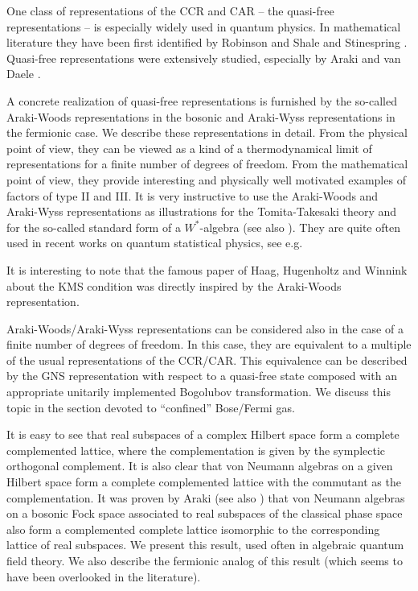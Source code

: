 \documentclass{svmult}
\begin{document}
 One class of representations of the CCR and CAR -- the quasi-free
representations -- is especially widely used in quantum physics.
In mathematical literature they have been first identified  by 
Robinson \cite{Rob} and Shale and Stinespring \cite{ShSt}.
Quasi-free representations were extensively studied,
especially by Araki \cite{Ar6,Ar2,Ar3,ArShi,AY} and van Daele \cite{vD}.

 A concrete
realization of quasi-free representations is furnished by the so-called
Araki-Woods representations  \cite{AW} in the bosonic 
and  Araki-Wyss representations  \cite{AWy} in
the fermionic case. We describe these representations in detail. 
 From the physical point of view, they can be viewed as
a kind of a thermodynamical limit of representations for a finite number of
degrees of freedom.  From the mathematical point of view,
they provide interesting and physically well motivated
examples of factors of type II and III. 
 It is very instructive to use the
Araki-Woods and Araki-Wyss  representations as  illustrations for the
Tomita-Takesaki theory and for the so-called standard form of a $W^*$-algebra
\cite{Ha}
(see also \cite{Ar2,Co,BR1,St, DJP}). They are quite often used in recent
works on quantum statistical physics, see e.g. \cite{DJ2,JP}

It is interesting to note that the famous paper of Haag, Hugenholtz and 
Winnink \cite{HHW} about the KMS condition was directly inspired by 
the Araki-Woods representation.



Araki-Woods/Araki-Wyss representations can be considered also in the case of
a finite number of degrees of freedom. In this case, they are equivalent to a
multiple of the usual representations of the CCR/CAR. This equivalence can be
described by the GNS representation with respect to
 a quasi-free state composed
with an appropriate unitarily implemented Bogolubov transformation. We
discuss this topic in the section devoted to ``confined'' Bose/Fermi gas.


It is easy to  see that real subspaces of a complex Hilbert space form a
complete complemented lattice, where the complementation is given by the
symplectic orthogonal complement.
It is also clear that von Neumann algebras on a given Hilbert space form a
complete complemented lattice with the commutant as the complementation. It
was proven by Araki \cite{Ar4} (see also \cite{EO})
 that von Neumann algebras on a bosonic Fock
space associated to real subspaces of the classical phase space also form a
complemented complete lattice isomorphic to the corresponding lattice of real
subspaces. We present this result, used often in algebraic quantum field
theory. We also describe the fermionic analog of this result (which seems to  
 have been overlooked 
in the literature).
\end{document}
